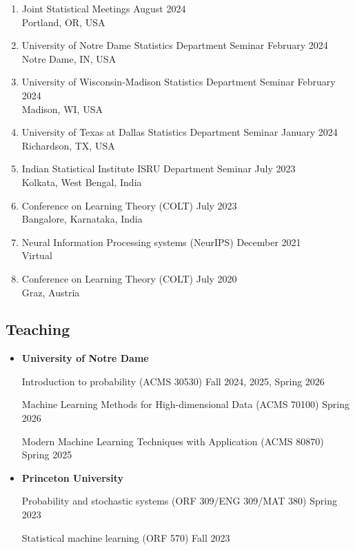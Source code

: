 \documentclass[letterpaper,12pt,oneside]{article}
\theoremstyle{definition}
\begin{document}
\begin{enumerate}
				\item Joint Statistical Meetings
				\hfill August 2024\\
				Portland, OR, USA 
				
				\item University of Notre Dame Statistics Department Seminar
				\hfill February 2024\\
				Notre Dame, IN, USA
				
				\item University of Wisconsin-Madison Statistics Department Seminar
				\hfill February 2024\\
				Madison, WI, USA
				
				\item University of Texas at Dallas Statistics Department Seminar
				\hfill January 2024\\
				Richardson, TX, USA
				
				\item Indian Statistical Institute ISRU Department Seminar \hfill July 2023\\
				Kolkata, West Bengal, India
				
				\item Conference on Learning Theory (COLT) \hfill July 2023\\
				Bangalore, Karnataka, India
				
				\item Neural Information Processing systems (NeurIPS) \hfill December 2021\\
				Virtual
				
				\item Conference on Learning Theory (COLT) \hfill July 2020\\
				Graz, Austria
				
			\end{enumerate}
			
			
			\subsection*{Teaching}
			\begin{itemize}
				
				\item[] {\bf University of Notre Dame} 
				
				{Introduction to probability} (ACMS 30530) \hfill Fall 2024, 2025, Spring 2026
				
				{Machine Learning Methods for High-dimensional Data} (ACMS 70100) \hfill Spring 2026
				
				{Modern Machine Learning Techniques with Application} (ACMS 80870) \hfill Spring 2025
				
				
				\item[] {\bf Princeton University} 
				
				{Probability and stochastic systems} (ORF 309/ENG 309/MAT 380) \hfill Spring 2023
				
				{Statistical machine learning} (ORF 570)  \hfill Fall 2023
			\end{itemize}
			
\end{document}
